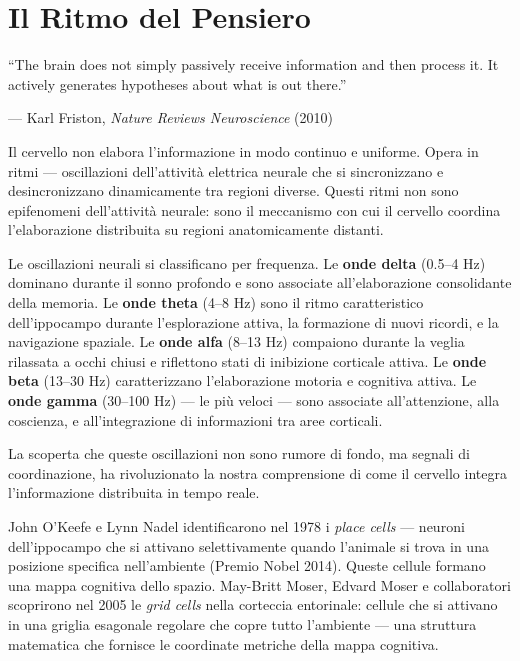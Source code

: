 \documentclass[12pt,a4paper,openany]{book}
\newcommand{\sezione}[1]{\vspace{1.2em}{\large\bfseries #1}\vspace{0.5em}\par}
\begin{document}
\chapter{Il Ritmo del Pensiero}

\epigraph{``The brain does not simply passively receive information and then process it. It actively generates hypotheses about what is out there.''}{--- Karl Friston, \textit{Nature Reviews Neuroscience} (2010)}

\sezione{Il cervello come sistema ritmico}

Il cervello non elabora l'informazione in modo continuo e uniforme. Opera in ritmi — oscillazioni dell'attività elettrica neurale che si sincronizzano e desincronizzano dinamicamente tra regioni diverse. Questi ritmi non sono epifenomeni dell'attività neurale: sono il meccanismo con cui il cervello coordina l'elaborazione distribuita su regioni anatomicamente distanti.

Le oscillazioni neurali si classificano per frequenza. Le \textbf{onde delta} (0.5--4 Hz) dominano durante il sonno profondo e sono associate all'elaborazione consolidante della memoria. Le \textbf{onde theta} (4--8 Hz) sono il ritmo caratteristico dell'ippocampo durante l'esplorazione attiva, la formazione di nuovi ricordi, e la navigazione spaziale. Le \textbf{onde alfa} (8--13 Hz) compaiono durante la veglia rilassata a occhi chiusi e riflettono stati di inibizione corticale attiva. Le \textbf{onde beta} (13--30 Hz) caratterizzano l'elaborazione motoria e cognitiva attiva. Le \textbf{onde gamma} (30--100 Hz) — le più veloci — sono associate all'attenzione, alla coscienza, e all'integrazione di informazioni tra aree corticali.

La scoperta che queste oscillazioni non sono rumore di fondo, ma segnali di coordinazione, ha rivoluzionato la nostra comprensione di come il cervello integra l'informazione distribuita in tempo reale.

\sezione{Il ritmo theta ippocampale e la codifica della memoria}

John O'Keefe e Lynn Nadel identificarono nel 1978 i \textit{place cells} — neuroni dell'ippocampo che si attivano selettivamente quando l'animale si trova in una posizione specifica nell'ambiente (Premio Nobel 2014). Queste cellule formano una mappa cognitiva dello spazio. May-Britt Moser, Edvard Moser e collaboratori scoprirono nel 2005 le \textit{grid cells} nella corteccia entorinale: cellule che si attivano in una griglia esagonale regolare che copre tutto l'ambiente — una struttura matematica che fornisce le coordinate metriche della mappa cognitiva.
\end{document}

